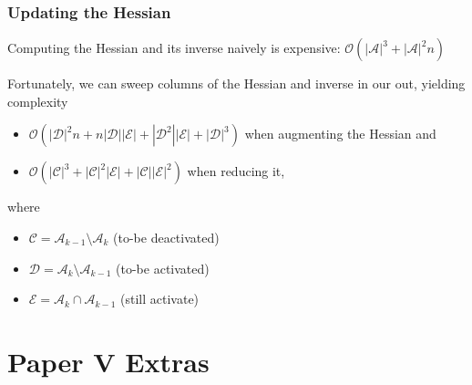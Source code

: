 \documentclass[10pt]{beamer}
\begin{document}
\begin{frame}
  \frametitle{Updating the Hessian}
  Computing the Hessian and its inverse naively is expensive:
  \(\mathcal{O}(|\mathcal{A}|^3 + |\mathcal{A}|^2n)\)

  \medskip\pause

  Fortunately, we can sweep columns of the Hessian and inverse in our out, yielding
  complexity
  \begin{itemize}
    \item \(\mathcal{O}(|\mathcal{D}|^2n + n|\mathcal{D}||\mathcal{E}| +
          |\mathcal{D}^2||\mathcal{E}| + |\mathcal{D}|^3)\) when
          augmenting the Hessian and
    \item \(\mathcal{O}(|\mathcal{C}|^3 + |\mathcal{C}|^2|\mathcal{E}| +
          |\mathcal{C}||\mathcal{E}|^2)\) when reducing it,
  \end{itemize}
  where
  \begin{itemize}
    \item \(\mathcal{C} = \mathcal{A}_{k-1} \setminus \mathcal{A}_k\)
          (to-be deactivated)
    \item \(\mathcal{D} = \mathcal{A}_k \setminus \mathcal{A}_{k-1}\)
          (to-be activated)
    \item \(\mathcal{E} = \mathcal{A}_k \cap \mathcal{A}_{k-1}\)
          (still activate)
  \end{itemize}
\end{frame}

\section{Paper V Extras}
\end{document}
